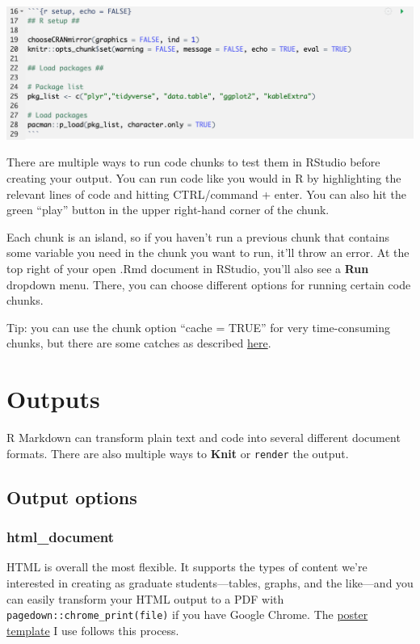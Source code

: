 \documentclass[
  openany]{book}
\begin{document}
\includegraphics[width=\textwidth]{images/example_chunk}

There are multiple ways to run code chunks to test them in RStudio before creating your output. You can run code like you would in R by highlighting the relevant lines of code and hitting CTRL/command + enter. You can also hit the green ``play'' button in the upper right-hand corner of the chunk.

Each chunk is an island, so if you haven't run a previous chunk that contains some variable you need in the chunk you want to run, it'll throw an error. At the top right of your open .Rmd document in RStudio, you'll also see a \textbf{Run} dropdown menu. There, you can choose different options for running certain code chunks.

Tip: you can use the chunk option ``cache = TRUE'' for very time-consuming chunks, but there are some catches as described \href{https://bookdown.org/yihui/rmarkdown-cookbook/cache.html}{here}.

\hypertarget{output}{%
\chapter{Outputs}\label{output}}

R Markdown can transform plain text and code into several different document formats. There are also multiple ways to \textbf{Knit} or \texttt{render} the output.

\hypertarget{output-options}{%
\section{Output options}\label{output-options}}

\hypertarget{html_document}{%
\subsection{html\_document}\label{html_document}}

HTML is overall the most flexible. It supports the types of content we're interested in creating as graduate students---tables, graphs, and the like---and you can easily transform your HTML output to a PDF with \texttt{pagedown::chrome\_print(file)} if you have Google Chrome. The \href{https://github.com/brentthorne/posterdown}{poster template} I use follows this process.
\end{document}
